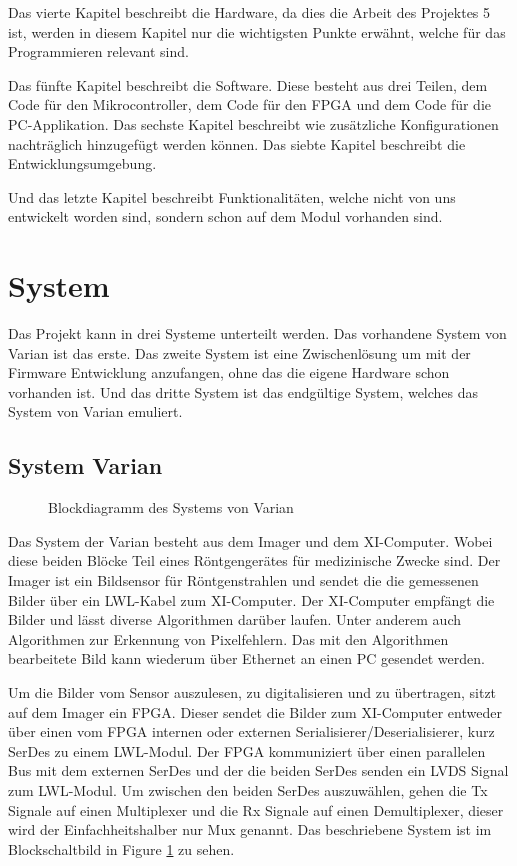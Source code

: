 \documentclass{article}
\begin{document}
Das vierte Kapitel beschreibt die Hardware, da dies die Arbeit des Projektes 5 ist, werden in diesem Kapitel nur die wichtigsten Punkte erwähnt, welche für das Programmieren relevant sind.

Das fünfte Kapitel beschreibt die Software. Diese besteht aus drei Teilen, dem Code für den Mikrocontroller, dem Code für den FPGA und dem Code für die PC-Applikation.
Das sechste Kapitel beschreibt wie zusätzliche Konfigurationen nachträglich hinzugefügt werden können.
Das siebte Kapitel beschreibt die Entwicklungsumgebung.

Und das letzte Kapitel beschreibt Funktionalitäten, welche nicht von uns entwickelt worden sind, sondern schon auf dem Modul vorhanden sind.

\section{System}
Das Projekt kann in drei Systeme unterteilt werden. Das vorhandene System von Varian ist das erste. Das zweite System ist eine Zwischenlösung um mit der Firmware Entwicklung anzufangen, ohne das die eigene Hardware schon vorhanden ist. Und das dritte System ist das endgültige System, welches das System von Varian emuliert.

\subsection{System Varian}
\begin{figure}[tb]
    \caption{Blockdiagramm des Systems von Varian}
    \label{fig:bd_varian}
\end{figure}

Das System der Varian besteht aus dem Imager und dem XI-Computer. Wobei diese beiden Blöcke Teil eines Röntgengerätes für medizinische Zwecke sind. Der Imager ist ein Bildsensor für Röntgenstrahlen und sendet die die gemessenen Bilder über ein LWL-Kabel zum XI-Computer. Der XI-Computer empfängt die Bilder und lässt diverse Algorithmen darüber laufen. Unter anderem auch Algorithmen zur Erkennung von Pixelfehlern. Das mit den Algorithmen bearbeitete Bild kann wiederum über Ethernet an einen PC gesendet werden.

Um die Bilder vom Sensor auszulesen, zu digitalisieren und zu übertragen, sitzt auf dem Imager ein FPGA. Dieser sendet die Bilder zum XI-Computer entweder über einen vom FPGA internen oder externen Serialisierer/Deserialisierer, kurz SerDes zu einem LWL-Modul. Der FPGA kommuniziert über einen parallelen Bus mit dem externen SerDes und der die beiden SerDes senden ein LVDS Signal zum LWL-Modul. Um zwischen den beiden SerDes auszuwählen, gehen die Tx Signale auf einen Multiplexer und die Rx Signale auf einen Demultiplexer, dieser wird der Einfachheitshalber nur Mux genannt. Das beschriebene System ist im Blockschaltbild in Figure \ref{fig:bd_varian} zu sehen.
\end{document}

